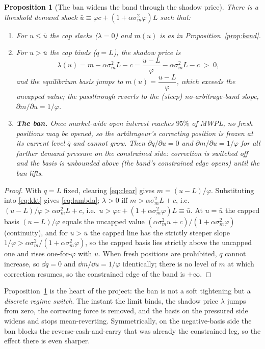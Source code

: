 \documentclass[11pt,a4paper]{article}
\theoremstyle{plain}
\newtheorem{proposition}{Proposition}
\theoremstyle{definition}
\theoremstyle{remark}
\begin{document}
\begin{proposition}[The ban widens the band through the shadow price]\label{prop:ban}
There is a threshold demand shock $\bar u \equiv \varphi c + (1+\alpha\sigma_m^2\varphi)L$ such that:
\begin{enumerate}[leftmargin=1.6em,itemsep=2pt]
\item For $u\le \bar u$ the cap slacks ($\lambda=0$) and $m(u)$ is as in Proposition~\ref{prop:band}.
\item For $u>\bar u$ the cap binds ($q=L$), the shadow price is
\begin{equation}
\lambda(u) = m - \alpha\sigma_m^2 L - c = \frac{u-L}{\varphi} - \alpha\sigma_m^2 L - c \;>\;0, \label{eq:lambda}
\end{equation}
and the equilibrium basis jumps to $m(u)=\dfrac{u-L}{\varphi}$, which exceeds the uncapped value; the passthrough reverts to the (steep) no-arbitrage-band slope, $\partial m/\partial u = 1/\varphi$.
\item \textbf{The ban.} Once market-wide open interest reaches $95\%$ of MWPL, no fresh positions may be opened, so the arbitrageur's correcting position is frozen at its current level $\bar q$ and cannot grow. Then $\partial q/\partial u=0$ and $\partial m/\partial u = 1/\varphi$ for all further demand pressure on the constrained side: correction is switched off and the basis is unbounded above (the band's constrained edge opens) until the ban lifts.
\end{enumerate}
\end{proposition}
\begin{proof}
With $q=L$ fixed, clearing \eqref{eq:clear} gives $m=(u-L)/\varphi$. Substituting into \eqref{eq:kkt} gives \eqref{eq:lambda}; $\lambda>0$ iff $m>\alpha\sigma_m^2 L + c$, i.e.\ $(u-L)/\varphi>\alpha\sigma_m^2L+c$, i.e.\ $u>\varphi c + (1+\alpha\sigma_m^2\varphi)L\equiv\bar u$. At $u=\bar u$ the capped basis $(u-L)/\varphi$ equals the uncapped value $(\alpha\sigma_m^2 u+c)/(1+\alpha\sigma_m^2\varphi)$ (continuity), and for $u>\bar u$ the capped line has the strictly steeper slope $1/\varphi>\alpha\sigma_m^2/(1+\alpha\sigma_m^2\varphi)$, so the capped basis lies strictly above the uncapped one and rises one-for-$\varphi$ with $u$. When fresh positions are prohibited, $q$ cannot increase, so $\dd q=0$ and $\dd m/\dd u=1/\varphi$ identically; there is no level of $m$ at which correction resumes, so the constrained edge of the band is $+\infty$.
\end{proof}

Proposition~\ref{prop:ban} is the heart of the project: the ban is not a soft tightening but a \emph{discrete regime switch}. The instant the limit binds, the shadow price $\lambda$ jumps from zero, the correcting force is removed, and the basis on the pressured side widens and stops mean-reverting. Symmetrically, on the negative-basis side the ban blocks the reverse-cash-and-carry that was already the constrained leg, so the effect there is even sharper.
\end{document}
